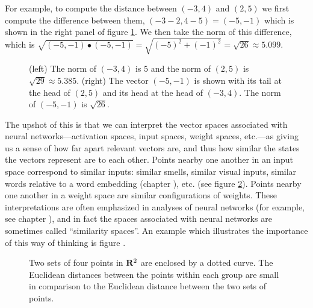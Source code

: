 For example, to compute the distance between $(-3,4)$ and $(2,5)$ we first compute the difference between them, 
$(-3 -2,  4- 5) = (-5,-1)$ which is shown in the right 
panel of figure \ref{metricfig}. We then take the norm of this difference, which is $ \sqrt{ (-5,-1) \bullet  (-5,-1)}  = \sqrt{(-5)^2+(-1)^2} 
= \sqrt{26} \approx 5.099$.

\begin{figure}[h]
\centering
{}
\qquad
{}
\caption{(left) The norm of $(-3,4)$ is $5$ and the norm of $(2,5)$ is 
$\sqrt{29} \approx 5.385$. (right) The vector $(-5,-1)$ is shown with its tail at the head 
of $(2,5)$ and its head at the head of $(-3,4)$. The norm of $(-5,-1)$ is 
$\sqrt{26}$.}
\label{metricfig}
\end{figure}

   The upshot of this is that we can interpret the vector spaces associated 
with neural networks---activation spaces, input spaces, weight spaces, etc.---as 
giving us a sense of how far apart relevant vectors are, and thus how similar 
the states the vectors represent are to each other. Points nearby one another 
in an input space correspond to similar inputs: similar smells, similar visual 
inputs, similar words relative to a word embedding (chapter 
), etc. (see figure \ref{nearfar}). Points nearby one 
another in a weight space are similar configurations of weights. These 
interpretations are often emphasized in analyses of neural networks (for 
example, see chapter ), and in fact the spaces 
associated with neural networks are sometimes called ``similarity spaces''. An 
example which illustrates the importance of this way of thinking is figure 
.

\begin{figure}[h]
\centering
{}
\caption{Two sets of four points in ${\bf R}^2$ are enclosed by a dotted curve. 
The Euclidean distances between the points within each group are small in 
comparison to the Euclidean distance between the two sets of points.}
\label{nearfar}
\end{figure}

